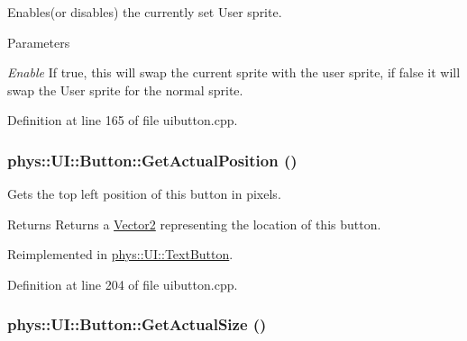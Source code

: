 Enables(or disables) the currently set User sprite. 


\begin{DoxyParams}{Parameters}
\item[{\em Enable}]If true, this will swap the current sprite with the user sprite, if false it will swap the User sprite for the normal sprite. \end{DoxyParams}


Definition at line 165 of file uibutton.cpp.

\hypertarget{classphys_1_1UI_1_1Button_a0b991ada87707d8d951dae7c0e3246f6}{
\subsubsection[{GetActualPosition}]{ phys::UI::Button::GetActualPosition ()}}
\label{d8/d88/classphys_1_1UI_1_1Button_a0b991ada87707d8d951dae7c0e3246f6}


Gets the top left position of this button in pixels. 

\begin{DoxyReturn}{Returns}
Returns a \hyperlink{classphys_1_1Vector2}{Vector2} representing the location of this button. 
\end{DoxyReturn}


Reimplemented in \hyperlink{classphys_1_1UI_1_1TextButton_ab406bec58bf6244c3e867fefd19d4d7f}{phys::UI::TextButton}.



Definition at line 204 of file uibutton.cpp.

\hypertarget{classphys_1_1UI_1_1Button_ab6640af433afe96d5f6bd7016986d73f}{
\subsubsection[{GetActualSize}]{ phys::UI::Button::GetActualSize ()}}
\label{d8/d88/classphys_1_1UI_1_1Button_ab6640af433afe96d5f6bd7016986d73f}


